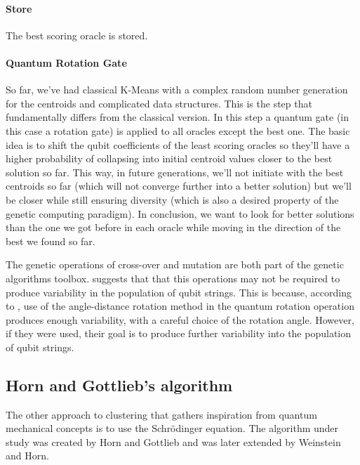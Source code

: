 \paragraph{Store}
The best scoring oracle is stored.

\paragraph{Quantum Rotation Gate}
So far, we've had classical K-Means with a complex random number generation for the centroids and complicated data structures. This is the step that fundamentally differs from the classical version. In this step a quantum gate (in this case a rotation gate) is applied to all oracles except the best one. The basic idea is to shift the qubit coefficients of the least scoring oracles so they'll have a higher probability of collapsing into initial centroid values closer to the best solution so far. This way, in future generations, we'll not initiate with the best centroids so far (which will not converge further into a better solution) but we'll be closer while still ensuring diversity (which is also a desired property of the genetic computing paradigm). In conclusion, we want to look for better solutions than the one we got before in each oracle while moving in the direction of the best we found so far.


The genetic operations of cross-over and mutation are both part of the genetic algorithms toolbox. \cite{Wiebe2014} suggests that that this operations may not be required to produce variability in the population of qubit strings. This is because, according to \cite{Liu2010}, use of the angle-distance rotation method in the quantum rotation operation produces enough variability, with a careful choice of the rotation angle. However, if they were used, their goal is to produce further variability into the population of qubit strings.



\subsection{Horn and Gottlieb's algorithm}

The other approach to clustering that gathers inspiration from quantum mechanical concepts is to use the Schrödinger equation. The algorithm under study was created by Horn and Gottlieb and was later extended by Weinstein and Horn.

